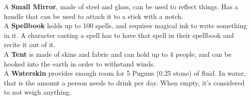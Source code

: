 A \textbf{Small Mirror}, made of steel and glass, can be used to reflect things. Has a handle that can be used to attach it to a stick with a notch.\\

A \textbf{Spellbook} holds up to 100 spells, and requires magical ink to write something in it. A character casting a spell has to have that spell in their spellbook and recite it out of it.\\

A \textbf{Tent} is made of skins and fabric and can hold up to 4 people, and can be hooked into the earth in order to withstand winds.\\

A \textbf{Waterskin} provides enough room for 5 Pugnus (0.25 stone) of fluid. In water, that is the amount a person needs to drink per day. When empty, it's considered to not weigh anything.\\